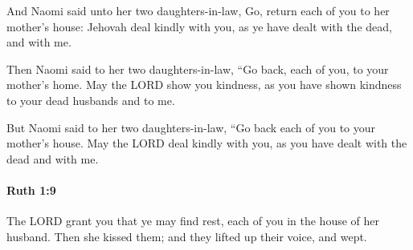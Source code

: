 			\begin{versebox}
					\item[BHS] 
					\item[LXX] 
					\item[ASV] And Naomi said unto her two daughters-in-law, Go, return each of you to her mother's house: Jehovah deal kindly with you, as ye have dealt with the dead, and with me.
					\item[NIV] Then Naomi said to her two daughters-in-law, “Go back, each of you, to your mother’s home. May the LORD show you kindness, as you have shown kindness to your dead husbands and to me.
					\item[NRSV] But Naomi said to her two daughters-in-law, “Go back each of you to your mother’s house. May the LORD deal kindly with you, as you have dealt with the dead and with me.
			\end{versebox}

		\paragraph{Ruth 1:9} %
			\label{RUTH-1-9}

			The LORD grant you that ye may find rest, each of you in the house of her husband. Then she kissed them; and they lifted up their voice, and wept.

